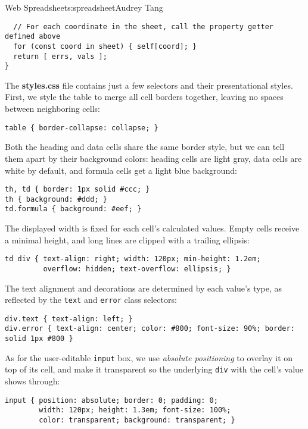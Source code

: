\begin{aosachapter}{Web Spreadsheet}{s:spreadsheet}{Audrey Tang}
\begin{verbatim}
  // For each coordinate in the sheet, call the property getter defined above
  for (const coord in sheet) { self[coord]; }
  return [ errs, vals ];
}
\end{verbatim}

\label{css}

The \textbf{styles.css} file contains just a few selectors and their
presentational styles. First, we style the table to merge all cell
borders together, leaving no spaces between neighboring cells:

\begin{verbatim}
table { border-collapse: collapse; }
\end{verbatim}

Both the heading and data cells share the same border style, but we can
tell them apart by their background colors: heading cells are light
gray, data cells are white by default, and formula cells get a light
blue background:

\begin{verbatim}
th, td { border: 1px solid #ccc; }
th { background: #ddd; }
td.formula { background: #eef; }
\end{verbatim}

The displayed width is fixed for each cell's calculated values. Empty
cells receive a minimal height, and long lines are clipped with a
trailing ellipsis:

\begin{verbatim}
td div { text-align: right; width: 120px; min-height: 1.2em;
         overflow: hidden; text-overflow: ellipsis; }
\end{verbatim}

The text alignment and decorations are determined by each value's type,
as reflected by the \texttt{text} and \texttt{error} class selectors:

\begin{verbatim}
div.text { text-align: left; }
div.error { text-align: center; color: #800; font-size: 90%; border: solid 1px #800 }
\end{verbatim}

As for the user-editable \texttt{input} box, we use \emph{absolute
positioning} to overlay it on top of its cell, and make it transparent
so the underlying \texttt{div} with the cell's value shows through:

\begin{verbatim}
input { position: absolute; border: 0; padding: 0;
        width: 120px; height: 1.3em; font-size: 100%;
        color: transparent; background: transparent; }
\end{verbatim}


\end{aosachapter}
